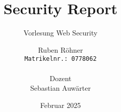 \documentclass[DIV=12]{scrreport}
\title{Security Report}
\subtitle{Vorlesung Web Security}
\author{
    Ruben Röhner\\
    \texttt{Matrikelnr.: 0778062}\\\\
    Dozent\\
    Sebastian Auwärter
}
\date{Februar 2025}
\begin{document}
\maketitle
\tableofcontents















\renewcommand{\listfigurename}{Abbildungsverzeichnis}
\listoffigures

\lstlistoflistings


\end{document}
